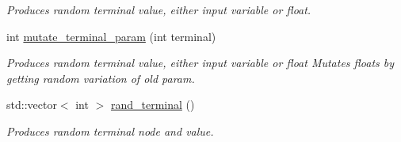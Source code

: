 \begin{DoxyCompactItemize}
\begin{DoxyCompactList}\small\item\em Produces random terminal value, either input variable or float. \end{DoxyCompactList}\item 
int \hyperlink{classAcyclicGraphManipulator_a7be7015974574f92858d6d4dac3f1fee}{mutate\+\_\+terminal\+\_\+param} (int terminal)
\begin{DoxyCompactList}\small\item\em Produces random terminal value, either input variable or float Mutates floats by getting random variation of old param. \end{DoxyCompactList}\item 
std\+::vector$<$ int $>$ \hyperlink{classAcyclicGraphManipulator_adbf93d559581182e4d4b6335952f5357}{rand\+\_\+terminal} ()
\begin{DoxyCompactList}\small\item\em Produces random terminal node and value. \end{DoxyCompactList}\end{DoxyCompactItemize}
